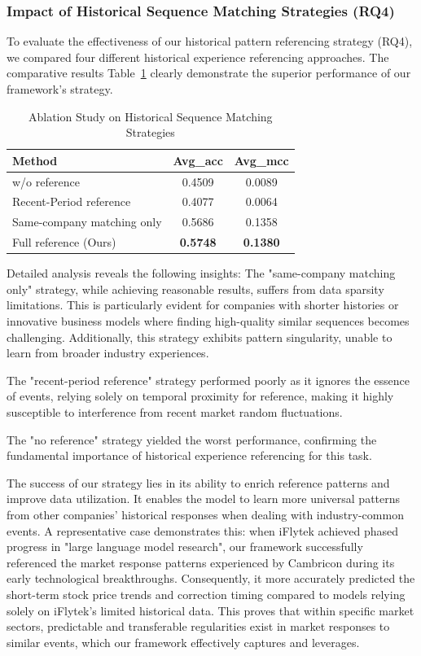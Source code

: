 \documentclass[sigconf, nonacm]{acmart} %
\begin{document}
\subsubsection{Impact of Historical Sequence Matching Strategies (RQ4)}

To evaluate the effectiveness of our historical pattern referencing strategy (RQ4), we compared four different historical experience referencing approaches. The comparative results Table~\ref{tab:ablation_matching} clearly demonstrate the superior performance of our framework's strategy.

\begin{table}[htbp]
\centering
\small
\caption{Ablation Study on Historical Sequence Matching Strategies}
\label{tab:ablation_matching}
\begin{tabular}{lcc}
\toprule
Method & Avg\_acc & Avg\_mcc \\
\midrule
w/o reference & 0.4509 & 0.0089 \\
Recent-Period reference & 0.4077 & 0.0064 \\
Same-company matching only & 0.5686 & 0.1358 \\
Full reference (Ours) & \textbf{0.5748} & \textbf{0.1380} \\
\bottomrule
\end{tabular}
\end{table}

Detailed analysis reveals the following insights: The "same-company matching only" strategy, while achieving reasonable results, suffers from data sparsity limitations. This is particularly evident for companies with shorter histories or innovative business models where finding high-quality similar sequences becomes challenging. Additionally, this strategy exhibits pattern singularity, unable to learn from broader industry experiences.

The "recent-period reference" strategy performed poorly as it ignores the essence of events, relying solely on temporal proximity for reference, making it highly susceptible to interference from recent market random fluctuations.

The "no reference" strategy yielded the worst performance, confirming the fundamental importance of historical experience referencing for this task.

The success of our strategy lies in its ability to enrich reference patterns and improve data utilization. It enables the model to learn more universal patterns from other companies' historical responses when dealing with industry-common events. A representative case demonstrates this: when iFlytek achieved phased progress in "large language model research", our framework successfully referenced the market response patterns experienced by Cambricon during its early technological breakthroughs. Consequently, it more accurately predicted the short-term stock price trends and correction timing compared to models relying solely on iFlytek's limited historical data. This proves that within specific market sectors, predictable and transferable regularities exist in market responses to similar events, which our framework effectively captures and leverages.
\end{document}
